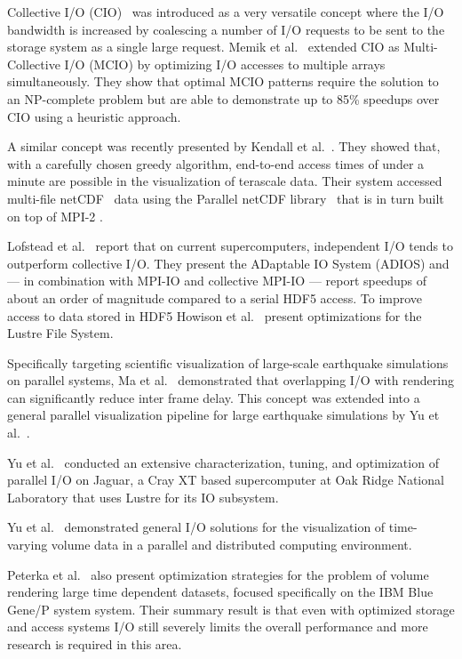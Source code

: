 Collective I/O (CIO)~\cite{Nitzberg:1995:PIO, Seamons:1995:SDCI,
Kotz:1997:DIMF} was introduced as a very versatile concept where the
I/O bandwidth is increased by coalescing a number of I/O requests to be
sent to the storage system as a single large request.
Memik et al.~\cite{Memik:2002:EIA} extended CIO as Multi-Collective
I/O (MCIO) by optimizing I/O accesses to multiple arrays
simultaneously. They show that optimal MCIO patterns require the
solution to an NP-complete problem but are able to demonstrate up to
85\% speedups over CIO using a heuristic approach.

A similar concept was recently presented by Kendall et
al.~\cite{Kendall:2009:TDO}. They showed that, with a carefully chosen
greedy algorithm, end-to-end access times of under a minute are
possible in the visualization of terascale data.  Their system accessed
multi-file netCDF~\cite{Rew:1990:NAIF} data using the Parallel netCDF
library~\cite{Li:2003:PNAH} that is in turn built on top of MPI-2
\cite{Gropp:1998:MTCR}.

Lofstead et
al.~\cite{Lofstead:2008:FIAI,Lofstead:2009:AMRI,ADIOS:Manual} report
that on current supercomputers, independent I/O tends to outperform
collective I/O. They present the ADaptable IO System (ADIOS) and ---
in combination with MPI-IO and collective MPI-IO --- report speedups
of about an order of magnitude compared to a serial HDF5 access. To
improve access to data stored in HDF5
Howison et al.~\cite{Howison:2010:THFL} present optimizations for the
Lustre File System.

Specifically targeting scientific visualization of large-scale
earthquake simulations on parallel systems, Ma et
al.~\cite{Ma:2003:VVLS} demonstrated that overlapping I/O with
rendering can significantly reduce inter frame delay. This concept was
extended into a general parallel visualization pipeline for large
earthquake simulations by Yu et al.~\cite{Yu:2004:PVPF}.

Yu et al.~\cite{Yu:2008:PADP} conducted an extensive characterization,
tuning, and optimization of parallel I/O on Jaguar, a Cray XT based
supercomputer at Oak Ridge National Laboratory that uses Lustre
\cite{Sun:2008:PSIW} for its IO subsystem.

Yu et al.~\cite{Yu:2004:ISFP} demonstrated general I/O solutions
for the visualization of time-varying volume data in a parallel and
distributed computing environment.

Peterka et al.~\cite{Peterka:2009:ETES} also present optimization
strategies for the problem of volume rendering large time dependent
datasets, focused specifically on the IBM Blue Gene/P system
system. Their summary result is that even with optimized storage and
access systems I/O still severely limits the overall performance and
more research is required in this area.


